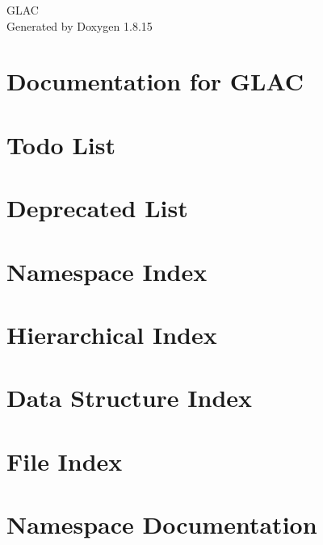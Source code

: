\let\mypdfximage\pdfximage\def\pdfximage{\immediate\mypdfximage}\documentclass[twoside]{book}
\newcommand{\+}{\discretionary{\mbox{\scriptsize$\hookleftarrow$}}{}{}}
\newcommand{\clearemptydoublepage}{%
  \newpage{\pagestyle{empty}\cleardoublepage}%
}
\begin{document}
\hypersetup{pageanchor=false,
             bookmarksnumbered=true,
             pdfencoding=unicode
            }
\begin{titlepage}
\vspace*{7cm}
\begin{center}%
{\Large G\+L\+AC }\\
\vspace*{1cm}
{\large Generated by Doxygen 1.8.15}\\
\end{center}
\end{titlepage}
\clearemptydoublepage
{}
\tableofcontents
\clearemptydoublepage
{}
\hypersetup{pageanchor=true}

\chapter{Documentation for G\+L\+AC}
\label{index}\hypertarget{index}{}
\chapter{Todo List}
\label{todo}

\chapter{Deprecated List}
\label{deprecated}

\chapter{Namespace Index}

\chapter{Hierarchical Index}

\chapter{Data Structure Index}

\chapter{File Index}

\chapter{Namespace Documentation}






\end{document}
